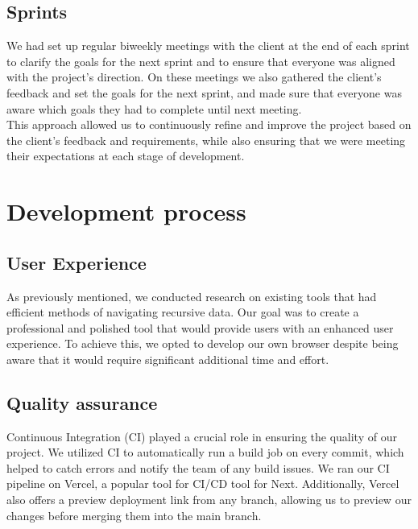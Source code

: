 \subsection{Sprints}

We had set up regular biweekly meetings with the client at the end of each sprint to clarify the goals for the next sprint and to ensure that everyone was aligned with the project's direction. On these meetings we also gathered the client's feedback and set the goals for the next sprint, and made sure that everyone was aware which goals they had to complete until next meeting. \\

\noindent
This approach allowed us to continuously refine and improve the project based on the client's feedback and requirements, while also ensuring that we were meeting their expectations at each stage of development. 


\section{Development process}

\subsection{User Experience}
As previously mentioned, we conducted research on existing tools that had efficient methods of navigating recursive data. Our goal was to create a professional and polished tool that would provide users with an enhanced user experience. To achieve this, we opted to develop our own browser despite being aware that it would require significant additional time and effort.

\subsection{Quality assurance}

Continuous Integration (CI) played a crucial role in ensuring the quality of our project. We utilized CI to automatically run a build job on every commit, which helped to catch errors and notify the team of any build issues. We ran our CI pipeline on Vercel, a popular tool for CI/CD tool for Next. Additionally, Vercel also offers a preview deployment link from any branch, allowing us to preview our changes before merging them into the main branch. \\

